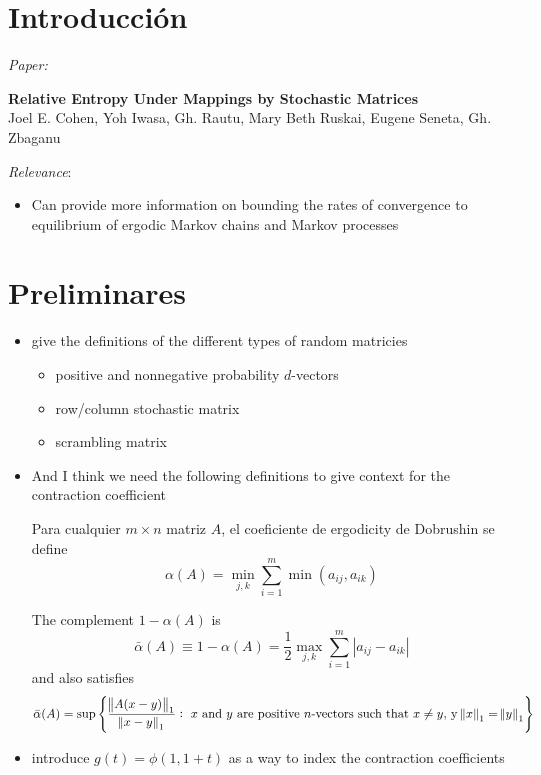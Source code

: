\documentclass[11pt]{article}
\begin{document}
\section{Introducción}
\noindent \textit{Paper:}
\begin{center}
    \textbf{Relative Entropy Under Mappings by Stochastic Matrices} \\
    Joel E. Cohen, Yoh Iwasa, Gh. Rautu, Mary Beth Ruskai, Eugene Seneta, Gh. Zbaganu
\end{center}
\noindent \textit{Relevance}: 
\begin{itemize}
    \item Can provide more information on bounding the rates of convergence to equilibrium of ergodic Markov chains and Markov processes 
\end{itemize}
\section{Preliminares}
\begin{itemize}
    \item give the definitions of the different types of random matricies
    \begin{itemize}
        \item positive and nonnegative probability $d$-vectors
        \item row/column stochastic matrix
        \item scrambling matrix
    \end{itemize}
    \item And I think we need the following definitions to give context for the contraction coefficient
    \begin{definition*}
        
    \end{definition*}
    \begin{definition*}
        
    \end{definition*}
    \begin{definition*}[2.3]
        Para cualquier $m \times n$ matriz $A$, el coeficiente de ergodicity de Dobrushin se define
        \[\alpha(A) = \min_{j, k}\sum_{i = 1}^m \min(a_{ij},a_{ik})\]
    \end{definition*}
    The complement $1- \alpha(A)$ is 
    \[\bar{\alpha}(A) \equiv 1 - \alpha(A) = \frac{1}{2} \max_{j,k}\sum_{i = 1}^m|a_{ij} - a_{ik}|\]
    and also satisfies
    \[\bar{\alpha}(A) = \sup \left\{\frac{\norm{A(x-y)}_1}{\norm{x-y}_1}: \text{ $x$ and $y$ are positive $n$-vectors such that } x\neq y, \, \text{y} \, \norm{x}_1 = \norm{y}_1\right\}\]
    \item introduce $g(t) = \phi(1, 1+t)$ as a way to index the contraction coefficients
\end{itemize}
\end{document}
